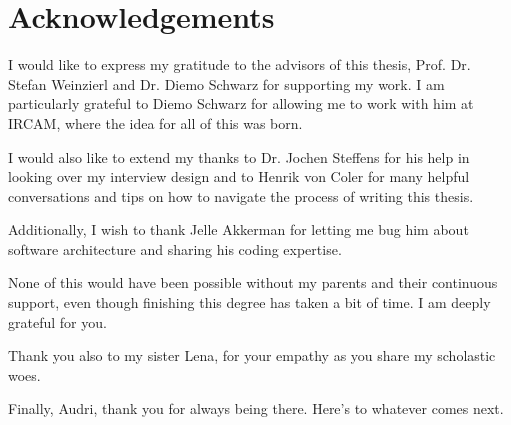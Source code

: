 
\section*{Acknowledgements}
I would like to express my gratitude to the advisors of this thesis, Prof. Dr.
Stefan Weinzierl and Dr. Diemo Schwarz for supporting my work. I am particularly
grateful to Diemo Schwarz for allowing me to work with him at IRCAM, where the
idea for all of this was born.

\bigskip
\noindent
I would also like to extend my thanks to Dr. Jochen Steffens for his help in
looking over my interview design and to Henrik von Coler for many helpful
conversations and tips on how to navigate the process of writing this thesis.

\bigskip
\noindent
Additionally, I wish to thank Jelle Akkerman for letting me bug him about
software architecture and sharing his coding expertise.

\bigskip
\noindent
None of this would have been possible without my parents and their continuous
support, even though finishing this degree has taken a bit of time. I am deeply
grateful for you.

\bigskip
\noindent
Thank you also to my sister Lena, for your empathy as you share my scholastic
woes.

\bigskip
\noindent
Finally, Audri, thank you for always being there. Here's to whatever comes next.

\newpage
